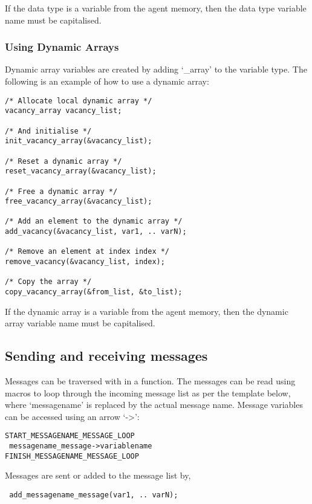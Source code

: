 If the data type is a variable from the agent memory, then the data type
variable name must be capitalised.

\subsubsection{Using Dynamic Arrays}

Dynamic array variables are created by adding `\_array' to the variable type.
The following is an example of how to use a dynamic array:

\begin{mylisting}
\begin{verbatim}
/* Allocate local dynamic array */
vacancy_array vacancy_list;

/* And initialise */
init_vacancy_array(&vacancy_list);

/* Reset a dynamic array */
reset_vacancy_array(&vacancy_list);

/* Free a dynamic array */
free_vacancy_array(&vacancy_list);

/* Add an element to the dynamic array */
add_vacancy(&vacancy_list, var1, .. varN);

/* Remove an element at index index */
remove_vacancy(&vacancy_list, index);

/* Copy the array */
copy_vacancy_array(&from_list, &to_list);
\end{verbatim}
\end{mylisting}

If the dynamic array is a variable from the agent memory, then the dynamic
array variable name must be capitalised.

\subsection{Sending and receiving messages}

Messages can be traversed with in a function. The messages can be read using macros to loop through the incoming message list as
per the template below, where `messagename' is replaced by the actual message
name. Message variables can be accessed using an arrow `->':

\begin{mylisting}
\begin{verbatim}
START_MESSAGENAME_MESSAGE_LOOP
 messagename_message->variablename
FINISH_MESSAGENAME_MESSAGE_LOOP
\end{verbatim}
\end{mylisting}

Messages are sent or added to the message list by,
\begin{mylisting}
\begin{verbatim}
 add_messagename_message(var1, .. varN);
\end{verbatim}
\end{mylisting}
